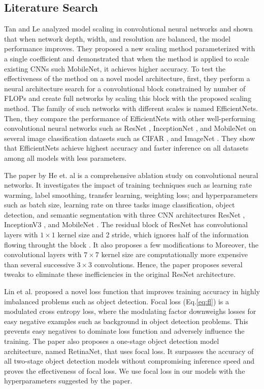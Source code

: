 \documentclass[conference]{IEEEtran}
\begin{document}
\subsection{Literature Search}

Tan and Le \cite{EfficientNet} analyzed model scaling in convolutional neural networks 
and shown that when network depth, width, and resolution are balanced, the model performance
improves. They proposed a new scaling method parameterized with a single coefficient and
demonstrated that when the method is applied to scale existing CNNs such MobileNet, it 
achieves higher accuracy.
To test the effectiveness of the method on a novel model architecture, first, 
they perform a neural architecture search for a convolutional block constrained 
by number of FLOPs and create full networks by scaling this block with 
the proposed scaling method.
The family of such networks with different scales is named EfficientNets.
Then, they compare the performance of EfficientNets with other well-performing
convolutional neural networks such as 
ResNet \cite{ResNet2016}, 
InceptionNet \cite{InceptionNetV1} \cite{InceptionNetV3} \cite{InceptionNetV4}, 
and MobileNet \cite{MobileNet2017} 
on several image classification datasets such as 
CIFAR \cite{CIFAR}, and ImageNet \cite{ImageNet2014}. 
They show that EfficientNets achieve highest accuracy and faster inference on 
all datasets among all models with less parameters.

The paper by He et. al is a comprehensive ablation study on convolutional neural networks.
It investigates the impact of training techniques such as 
learning rate warming, label smoothing, transfer learning, weighting loss; 
and hyperparameters such as batch size, learning rate on three tasks image classification, 
object detection, and semantic segmentation with three CNN architectures
ResNet \cite{ResNet2016}, Inception\-V3 \cite{InceptionNetV3}, 
and MobileNet \cite{MobileNet2017}. The residual block of ResNet has convolutional layers 
with $1 \times 1$ kernel size and 2 stride, which ignores half of the information flowing throught the block \cite{BagOfTricks}. It also proposes a few modifications to 
Moreover, the convolutional layers with $7 \times 7$ kernel size are computationally 
more expensive than several successive $3 \times 3$ convolutions. Hence, the paper
proposes several tweaks to eliminate these inefficiencies in the original ResNet architecture.

Lin et al. \cite{FocalLoss} proposed a novel loss function that improves training accuracy in 
highly imbalanced problems such as object detection. Focal loss (Eq.\ref{eq:fl}) is a modulated 
cross entropy loss, where the modulating factor downweighs losses for easy 
negative examples such as background in object detection problems. This prevents 
easy negatives to dominate loss function and adversely influence the training.
The paper also proposes a one-stage object detection model architecture, named RetinaNet, 
that uses focal loss. It surpasses the accuracy of all two-stage object detection models 
without compromising inference speed and proves the effectiveness of focal loss.
We use focal loss in our models with the hyperparameters suggested by the paper.
\end{document}
